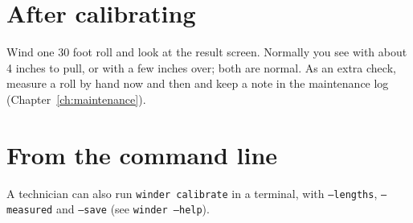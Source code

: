 \section{After calibrating}
Wind one 30 foot roll and look at the result screen. Normally you see
 with about 4 inches to pull, or  with a
few inches over; both are normal. As an extra check, measure a roll by hand now and then and keep a
note in the maintenance log (Chapter~\ref{ch:maintenance}).

\section{From the command line}
A technician can also run \texttt{winder calibrate} in a terminal, with
\texttt{--lengths}, \texttt{--measured} and \texttt{--save} (see
\texttt{winder --help}).
